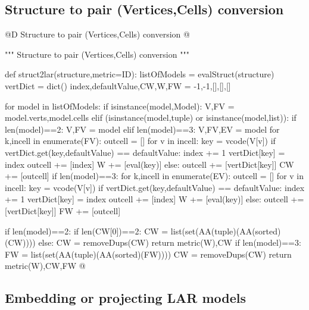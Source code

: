 \documentclass[11pt,oneside]{article}    %
\begin{document}
\subsection{Structure to pair (Vertices,Cells) conversion}
@D Structure to pair (Vertices,Cells) conversion
@{""" Structure to pair (Vertices,Cells) conversion """

def struct2lar(structure,metric=ID):
    listOfModels = evalStruct(structure)
    vertDict = dict()
    index,defaultValue,CW,W,FW = -1,-1,[],[],[]
        
    for model in listOfModels:
        if isinstance(model,Model):
            V,FV = model.verts,model.cells
        elif (isinstance(model,tuple) or isinstance(model,list)):
            if len(model)==2: V,FV = model
            elif len(model)==3: V,FV,EV = model
        for k,incell in enumerate(FV):
            outcell = []
            for v in incell:
                key = vcode(V[v])
                if vertDict.get(key,defaultValue) == defaultValue:
                    index += 1
                    vertDict[key] = index
                    outcell += [index]
                    W += [eval(key)]
                else: 
                    outcell += [vertDict[key]]
            CW += [outcell]
        if len(model)==3:
            for k,incell in enumerate(EV):
                outcell = []
                for v in incell:
                    key = vcode(V[v])
                    if vertDict.get(key,defaultValue) == defaultValue:
                        index += 1
                        vertDict[key] = index
                        outcell += [index]
                        W += [eval(key)]
                    else: 
                        outcell += [vertDict[key]]
                FW += [outcell]
            
    
    if len(model)==2: 
    	if len(CW[0])==2: 
			CW = list(set(AA(tuple)(AA(sorted)(CW))))
		else: CW = removeDups(CW)
    	return metric(W),CW
    if len(model)==3: 
    	FW = list(set(AA(tuple)(AA(sorted)(FW))))
		CW = removeDups(CW)
    	return metric(W),CW,FW
@}
\subsection{Embedding or projecting LAR models}
\end{document}
